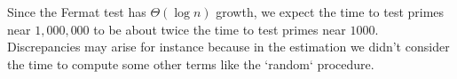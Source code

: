 Since the Fermat test has  $\Theta(\log n)$ growth, we expect the time to test primes near $1,000,000$ to be about twice the time to test primes near $1000$.  Discrepancies may arise for instance because in the estimation we didn't consider the time to compute some other terms like the `random` procedure.
